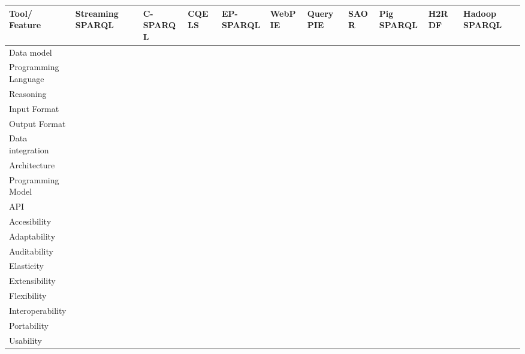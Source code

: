 \begin{sidewaystable}[!ht]
\renewcommand{\arraystretch}{1.3}
\tiny
\begin{center}
\begin{tabular}[c]{|p{1.7cm}|p{1.5cm}|p{1.5cm}|p{1.5cm}|p{1.5cm}|p{1.5cm}|p{1.5cm}|p{1.5cm}|p{1.5cm}|p{1.5cm}|p{1.5cm}|} 
\hline
 \textbf{Tool/ Feature}  &  Streaming SPARQL~\cite{Bolles:2008:SSE:1789394.1789438} & C-SPARQL~\cite{Barbieri:2010:EEC:1739041.1739095} & CQELS~\cite{deri2010} & EP-SPARQL~\cite{Anicic:2011:EUL:1963405.1963495} & WebPIE~\cite{DBLP:journals/ws/UrbaniKMHB12} & QueryPIE~\cite{Urbani:2011:QBR:2063016.2063063} & SAOR~\cite{DBLP:journals/ijswis/HoganHP09} & Pig SPARQL~\cite{Schatzle:2011:PMS:1999299.1999303} & H2RDF~\cite{Papailiou:2012:HAQ:2187980.2188058} & Hadoop SPARQL~\cite{liuhadoopsparql}  \\ \hline
   Data model &  &   &  &  &  &  &  &  &  & \\ \hline  
  Programming Language &  &   &  &  &  &  &  &  &  & \\ \hline  
  Reasoning &  &   &  &  &  &  &  &  &  & \\ \hline  
  Input Format &  &   &  &  &  &  &  &  &  & \\ \hline  
  Output Format &  &   &  &  &  &  &  &  &  & \\ \hline  
  Data integration &  &   &  &  &  &  &  &  &  & \\ \hline  
  Architecture &  &   &  &  &  &  &  &  &  & \\ \hline  
  Programming Model &  &   &  &  &  &  &  &  &  & \\ \hline  
  API &  &   &  &  &  &  &  &  &  & \\ \hline  
  Accesibility &  &   &  &  &  &  &  &  &  & \\ \hline  
  Adaptability &  &   &  &  &  &  &  &  &  & \\ \hline  
  Auditability &  &   &  &  &  &  &  &  &  & \\ \hline  
  Elasticity &  &   &  &  &  &  &  &  &  & \\ \hline  
  Extensibility &  &   &  &  &  &  &  &  &  & \\ \hline  
  Flexibility &  &   &  &  &  &  &  &  &  & \\ \hline  
  Interoperability &  &   &  &  &  &  &  &  &  & \\ \hline  
  Portability &  &   &  &  &  &  &  &  &  & \\ \hline  
  Usability &  &   &  &  &  &  &  &  &  & \\ \hline  

\end{tabular}
\end{center}
\end{sidewaystable}
